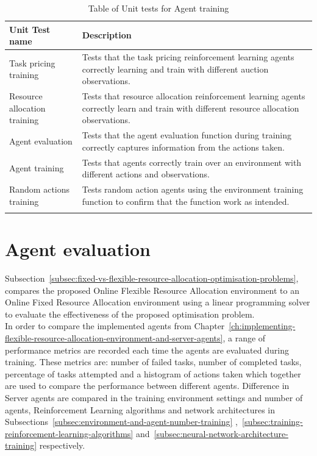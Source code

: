\begin{longtable}{|p{3cm}|p{11cm}|} \hline
    \textbf{Unit Test name} & \textbf{Description} \\ \hline
    Task pricing training & Tests that the task pricing reinforcement learning agents correctly learning and train
        with different auction observations. \\ \hline
    Resource allocation training & Tests that resource allocation reinforcement learning agents correctly learn and
        train with different resource allocation observations. \\ \hline
    Agent evaluation & Tests that the agent evaluation function during training correctly captures information from the
        actions taken. \\ \hline
    Agent training & Tests that agents correctly train over an environment with different actions and observations.
        \\ \hline
    Random actions training & Tests random action agents using the environment training function to confirm
        that the function work as intended. \\ \hline
    \caption{Table of Unit tests for Agent training}
    \label{tab:training-unit-tests}
\end{longtable}

\section{Agent evaluation}
\label{sec:agent-evaluation}
Subsection~\ref{subsec:fixed-vs-flexible-resource-allocation-optimisation-problems},
compares the proposed Online Flexible Resource Allocation environment to an Online Fixed Resource Allocation
environment using a linear programming solver to evaluate the effectiveness of the proposed optimisation problem. \\
In order to compare the implemented agents from
Chapter~\ref{ch:implementing-flexible-resource-allocation-environment-and-server-agents}, a range of performance metrics
are recorded each time the agents are evaluated during training. These metrics are: number of failed tasks, number
of completed tasks, percentage of tasks attempted and a histogram of actions taken which together are used to compare
the performance between different agents. Difference in Server agents are compared in the training environment settings
and number of agents, Reinforcement Learning algorithms and network architectures in
Subsections~\ref{subsec:environment-and-agent-number-training}
,~\ref{subsec:training-reinforcement-learning-algorithms} and~\ref{subsec:neural-network-architecture-training}
respectively.

